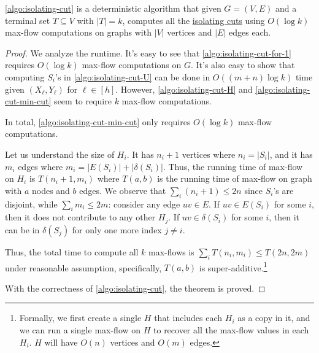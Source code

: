 \begin{theorem}\label{thm:isolating-min-cut}
	\autoref{algo:isolating-cut} is a deterministic algorithm that given \(G = (V, E)\) and a terminal set \(T \subseteq V\) with \(\lvert T \rvert = k\), computes all the \hyperref[prb:isolating-cut]{isolating cuts} using \(O(\log k)\) max-flow computations on graphs with \(\lvert V \rvert \) vertices and \(\lvert E \rvert \) edges each.
\end{theorem}
\begin{proof}
	We analyze the runtime. It's easy to see that \autoref{algo:isolating-cut-for-1} requires \(O(\log k)\) max-flow computations on \(G\). It's also easy to show that computing \(S_i\)'s in \autoref{algo:isolating-cut-U} can be done in \(O((m+n) \log k)\) time given \((X_{\ell } , Y_{\ell } )\) for \(\ell \in [h]\). However, \autoref{algo:isolating-cut-H} and \autoref{algo:isolating-cut-min-cut} seem to require \(k\) max-flow computations.

	\begin{claim}
		In total, \autoref{algo:isolating-cut-min-cut} only requires \(O(\log k)\) max-flow computations.
	\end{claim}
	\begin{explanation}
		Let us understand the size of \(H_i\). It has \(n_i + 1\) vertices where \(n_i = \lvert S_i \rvert \), and it has \(m_i\) edges where \(m_i = \lvert E(S_i) \rvert + \lvert \delta (S_i) \rvert \). Thus, the running time of max-flow on \(H_i\) is \(T(n_i + 1, m_i)\) where \(T(a, b)\) is the running time of max-flow on graph with \(a\) nodes and \(b\) edges. We observe that \(\sum_{i} (n_i + 1) \leq 2n\) since \(S_i\)'s are disjoint, while \(\sum_{i} m_i \leq 2m\): consider any edge \(uv \in E\). If \(uv \in E(S_i)\) for some \(i\), then it does not contribute to any other \(H_j\). If \(uv \in \delta (S_i)\) for some \(i\), then it can be in \(\delta (S_j)\) for only one more index \(j \neq i\).

		Thus, the total time to compute all \(k\) max-flows is \(\sum_{i} T(n_i, m_i) \leq T(2n, 2m)\) under reasonable assumption, specifically, \(T(a, b)\) is super-additive.\footnote{Formally, we first create a single \(H\) that includes each \(H_i\) as a copy in it, and we can run a single max-flow on \(H\) to recover all the max-flow values in each \(H_i\). \(H\) will have \(O(n)\) vertices and \(O(m)\) edges.}
	\end{explanation}
	With the correctness of \autoref{algo:isolating-cut}, the theorem is proved.
\end{proof}

